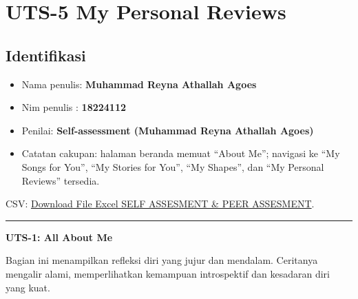 \documentclass[
  letterpaper,
  DIV=11,
  numbers=noendperiod]{scrreprt}
\providecommand{\tightlist}{%
  \setlength{\itemsep}{0pt}\setlength{\parskip}{0pt}}
\begin{document}

\chapter{UTS-5 My Personal Reviews}\label{uts-5-my-personal-reviews}

\section{Identifikasi}\label{identifikasi}

\begin{itemize}
\tightlist
\item
  Nama penulis: \textbf{Muhammad Reyna Athallah Agoes}
\item
  Nim penulis : \textbf{18224112}
\item
  Penilai: \textbf{Self-assessment (Muhammad Reyna Athallah Agoes)}
\item
  Catatan cakupan: halaman beranda memuat ``About Me''; navigasi ke ``My
  Songs for You'', ``My Stories for You'', ``My Shapes'', dan ``My
  Personal Reviews'' tersedia.
\end{itemize}

CSV: \href{sandbox:/mnt/data/UTS-5_skor.xlsv}{Download File Excel
\textbar{} SELF ASSESMENT \& PEER ASSESMENT}.

\begin{center}\rule{0.5\linewidth}{0.5pt}\end{center}

\textbf{UTS-1: All About Me}

Bagian ini menampilkan refleksi diri yang jujur dan mendalam. Ceritanya
mengalir alami, memperlihatkan kemampuan introspektif dan kesadaran diri
yang kuat.
\end{document}
